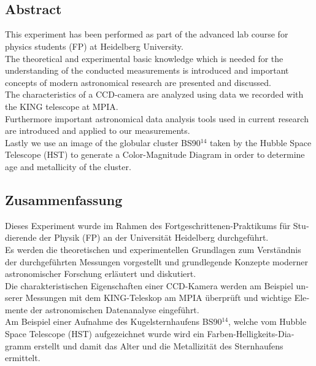 \makeatletter

\begin{centering}
\textbf{\Large\@title} \\
\vspace{.1cm}
\small\@author \\
\end{centering}

\makeatother

\vfill
 
{\let\raggedsection\centering
\begin{centering}
\section*{Abstract }
\end{centering}
This experiment has been performed as part of the advanced lab course for physics students (FP) at Heidelberg University. \\
The theoretical and experimental basic knowledge which is  needed for the understanding of the conducted measurements is introduced and important concepts of modern astronomical research are presented and discussed.\\
The characteristics of a CCD-camera are analyzed using data we recorded with the KING telescope at MPIA. \\
Furthermore important astronomical data analysis tools used in current research are introduced and applied to our measurements. \\
Lastly we use an image of the globular cluster BS90$^{14}$ taken by the Hubble Space Telescope (HST) to generate a Color-Magnitude Diagram in order to determine age and metallicity of the cluster.


\vfill
\begin{german}
\begin{centering}
\section*{Zusammenfassung}
\end{centering}
Dieses Experiment wurde im Rahmen des Fortgeschrittenen-Praktikums für Studierende der Physik (FP) an der Universität Heidelberg durchgeführt. \\
Es werden die theoretischen und experimentellen Grundlagen zum Verständnis der durchgeführten Messungen vorgestellt und grundlegende Konzepte moderner astronomischer Forschung erläutert und diskutiert. \\
Die charakteristischen Eigenschaften einer CCD-Kamera werden am Beispiel unserer Messungen mit dem KING-Teleskop am MPIA überprüft und wichtige Elemente der astronomischen Datenanalyse eingeführt. \\
Am Beispiel einer Aufnahme des Kugelsternhaufens BS90$^{14}$, welche vom Hubble Space Telescope (HST) aufgezeichnet wurde wird ein Farben-Helligkeits-Diagramm erstellt und damit das Alter und die Metallizität des Sternhaufens ermittelt. 

\end{german}}
\vfill
\blankpage